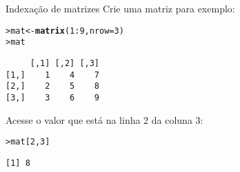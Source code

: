 \documentclass[10pt,handout]{beamer}\usepackage{graphicx, color}
\makeatletter
\newcommand{\hlfunctioncall}[1]{\textcolor[rgb]{0,0,0.545098039215686}{\textbf{#1}}}%
\newenvironment{kframe}{%
 \def\at@end@of@kframe{}%
 \ifinner\ifhmode%
  \def\at@end@of@kframe{\end{minipage}}%
  \begin{minipage}{\columnwidth}%
 \fi\fi%
 \def\FrameCommand##1{\hskip\@totalleftmargin \hskip-\fboxsep
 \colorbox{shadecolor}{##1}\hskip-\fboxsep
     \hskip-\linewidth \hskip-\@totalleftmargin \hskip\columnwidth}%
 \MakeFramed {\advance\hsize-\width
   \@totalleftmargin\z@ \linewidth\hsize
   \@setminipage}}%
 {\par\unskip\endMakeFramed%
 \at@end@of@kframe}
\newenvironment{knitrout}{}{} %
\makeatother
\begin{document}
\begin{frame}[fragile=singleslide]{Indexação de matrizes}
Crie uma matriz para exemplo:
\begin{knitrout}\small
{}\color{fgcolor}\begin{kframe}
\begin{alltt}
> mat <- \hlfunctioncall{matrix}(1:9, nrow=3)
> mat
\end{alltt}
\begin{verbatim}
     [,1] [,2] [,3]
[1,]    1    4    7
[2,]    2    5    8
[3,]    3    6    9
\end{verbatim}
\end{kframe}
\end{knitrout}

Acesse o valor que está na linha 2 da coluna 3:
\begin{knitrout}\small
{}\color{fgcolor}\begin{kframe}
\begin{alltt}
> mat[2,3]
\end{alltt}
\begin{verbatim}
[1] 8
\end{verbatim}
\end{kframe}
\end{knitrout}

\end{frame}
\end{document}
